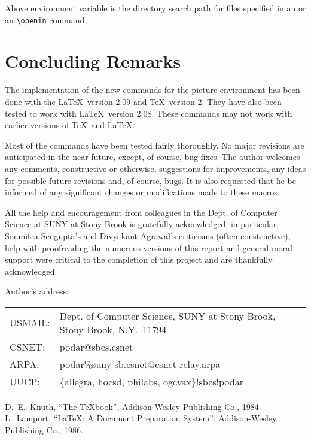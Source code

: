 Above environment variable is the directory search path for files specified
in an \verb|| or an \verb|\openin| command.

\section{Concluding Remarks}
The implementation of the new commands for the picture environment has been
done with the \LaTeX\ version 2.09 and \TeX\ version 2. They have also been
tested to work with \LaTeX\ version 2.08. These commands may not work with
earlier versions of \TeX\ and \LaTeX.

Most of the commands have been tested fairly thoroughly.
No major revisions are anticipated in the near
future, except, of course, bug fixes. The author welcomes any comments,
constructive or otherwise, suggestions for improvements, any ideas for
possible future revisions and, of course, bugs. It is also requested that he
be informed of any significant changes or modifications made to these
macros.

All the help and encouragement from colleagues in the Dept. of Computer
Science at SUNY at Stony Brook is gratefully acknowledged; in particular,
Soumitra Sengupta's and Divyakant Agrawal's criticisms (often constructive),
help with proofreading the numerous versions of this report and general moral
support were critical to the completion of this project and are thankfully
acknowledged.

\bigskip\noindent%
\begin{small}%
Author's address:\\[3mm]
\begin{tabular}{@{}ll}
USMAIL:&Dept. of Computer Science, SUNY at Stony Brook, Stony Brook,
N.Y.\ 11794\\
CSNET: &podar@sbcs.csnet\\
ARPA: &podar\%suny-sb.csnet@csnet-relay.arpa\\
UUCP: &\{allegra, hocsd, philabs, ogcvax\}!sbcs!podar
\end{tabular}
\end{small}

\begin{thebibliography}{99}
 D.\ E.\ Knuth, ``The \TeX book'', Addison-Wesley Publishing Co.,
1984.
 L.\ Lamport, ``\LaTeX: A Document Preparation System'',
Addison-Wesley Publishing Co., 1986.
\end{thebibliography}




